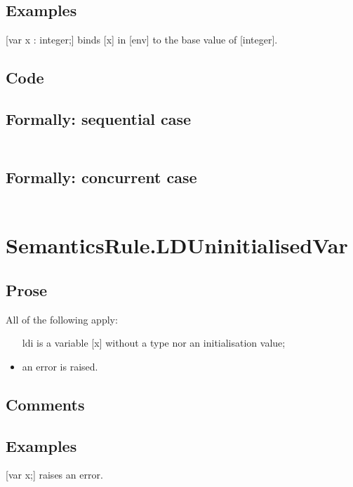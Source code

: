 \documentclass{book}
\begin{document}
    \subsection{Examples}
    [var x : integer;] binds [x] in [env] to the base value of [integer].

  \subsection{Code}

  \subsection{Formally: sequential case}
  \begin{align}
  \end{align} 

  \subsection{Formally: concurrent case}
  \begin{align}
  \end{align} 

\section{SemanticsRule.LDUninitialisedVar \label{sec:SemanticsRule.LDUninitialisedVar}}

    \subsection{Prose}
    All of the following apply:
    \begin{itemize}
    \item [ldi] is a variable [x] without a type nor an initialisation value;
    \item an error is raised.
    \end{itemize}

    \subsection{Comments}

    \subsection{Examples}
    [var x;] raises an error.
\end{document}

